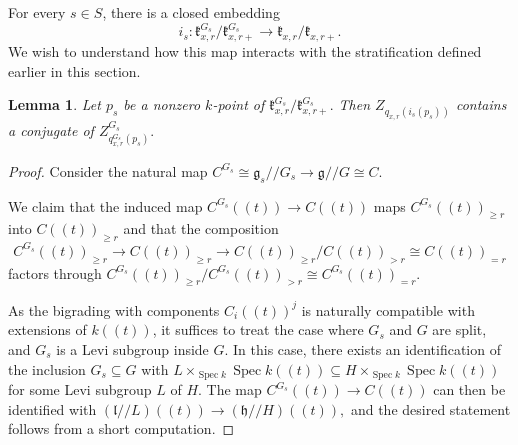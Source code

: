 \documentclass[12pt]{article}
\DeclareMathOperator{\Spec}{Spec}
\newtheorem{lemma}[theorem]{Lemma}
\theoremstyle{remark}
\begin{document}
For every $s\in S$, there is a closed embedding
\[
i_s:\mathfrak{k}_{x,r}^{G_s}/\mathfrak{k}_{x,r+}^{G_s}\rightarrow\mathfrak{k}_{x,r}/\mathfrak{k}_{x,r+}.
\]
We wish to understand how this map interacts with the stratification defined earlier in this section.

\begin{lemma}\label{levistabilizercompatibility}
Let $p_s$ be a nonzero $k$-point of $\mathfrak{k}_{x,r}^{G_s}/\mathfrak{k}_{x,r+}^{G_s}.$ Then $Z_{q_{x,r}(i_s(p_s))}$ contains a conjugate of $Z^{G_s}_{q_{x,r}^{G_s}(p_s)}.$
\end{lemma}

\begin{proof}
Consider the natural map $C^{G_s}\cong\mathfrak{g}_s//G_s\rightarrow\mathfrak{g}//G\cong C.$

We claim that the induced map $C^{G_s}((t))\rightarrow C((t))$ maps $C^{G_s}((t))_{\geq r}$ into $C((t))_{\geq r}$ and that the composition
\[
C^{G_s}((t))_{\geq r}\rightarrow C((t))_{\geq r}\rightarrow C((t))_{\geq r}/C((t))_{>r}\cong C((t))_{=r}
\]
factors through $C^{G_s}((t))_{\geq r}/C^{G_s}((t))_{>r}\cong C^{G_s}((t))_{=r}.$

As the bigrading with components $C_i((t))^j$ is naturally compatible with extensions of $k((t))$, it suffices to treat the case where $G_s$ and $G$ are split, and $G_s$ is a Levi subgroup inside $G$. In this case, there exists an identification of the inclusion $G_s\subseteq G$ with $L\times_{\Spec k}\Spec k((t))\subseteq H\times_{\Spec k}\Spec k((t))$ for some Levi subgroup $L$ of $H$. The map $C^{G_s}((t))\rightarrow C((t))$ can then be identified with $(\mathfrak{l}//L)((t))\rightarrow(\mathfrak{h}//H)((t)),$ and the desired statement follows from a short computation.


\end{proof}
\end{document}
